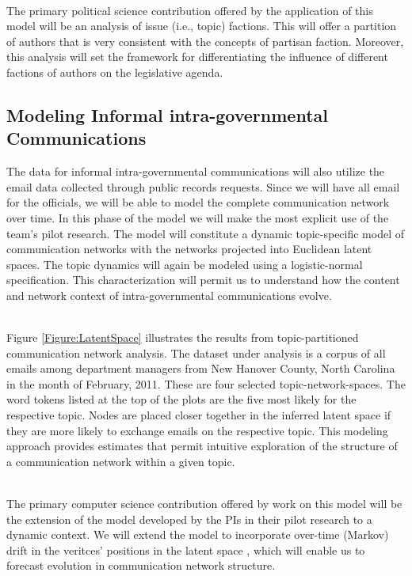 ~\\
 The primary political science contribution offered by the application of this model will be an analysis of issue (i.e., topic) factions. This will offer a partition of authors that is very consistent with the concepts of partisan faction. Moreover, this analysis will set the framework for differentiating the influence of different factions of authors on the legislative agenda.

\subsection{Modeling Informal intra-governmental Communications}

  The data for informal intra-governmental communications will also utilize the email data collected through public records requests. Since we will have all email for the officials, we will be able to model the complete communication network over time. In this phase of the model we will make the most explicit use of the team's pilot research. The model will constitute a dynamic topic-specific model of communication networks with the networks projected into Euclidean latent spaces. The topic dynamics will again be modeled using a logistic-normal specification. This characterization will permit us to understand how the content and network context of intra-governmental communications evolve.

~\\
 Figure \ref{Figure:LatentSpace} illustrates the results from topic-partitioned communication network analysis. The dataset under analysis is a corpus of all emails among department managers from New Hanover County, North Carolina in the month of February, 2011. These are four selected topic-network-spaces. The word tokens listed at the top of the plots are the five most likely for the respective topic. Nodes are placed closer together in the inferred latent space if they are more likely to exchange emails on the respective topic. This modeling approach provides estimates that permit intuitive exploration of the structure of a communication network within a given topic.

~\\
  The primary computer science contribution offered by work on this model will be the extension of the model developed by the PIs in their pilot research \cite{Krafft2012} to a dynamic context. We will extend the model to incorporate over-time (Markov) drift in the veritces' positions in the latent space \cite{Sarkar2005}, which will enable us to forecast evolution in communication network structure.

